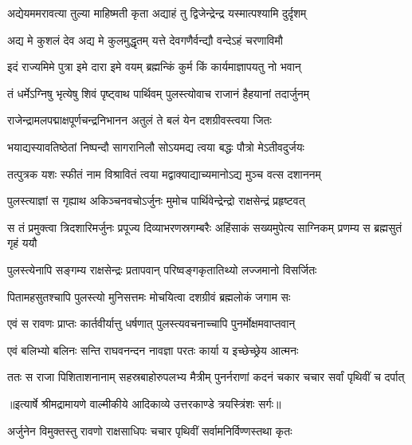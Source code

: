 \twolineshloka
{अद्येयममरावत्या तुल्या माहिष्मती कृता}
{अद्याहं तु द्विजेन्द्रेन्द्र यस्मात्पश्यामि दुर्दृशम्} %

\twolineshloka
{अद्य मे कुशलं देव अद्य मे कुलमुद्धृतम्}
{यत्ते देवगणैर्वन्द्यौ वन्देऽहं चरणाविमौ} %

\twolineshloka
{इदं राज्यमिमे पुत्रा इमे दारा इमे वयम्}
{ब्रह्मन्किं कुर्म किं कार्यमाज्ञापयतु नो भवान्} %

\twolineshloka
{तं धर्मेऽग्निषु भृत्येषु शिवं पृष्ट्वाथ पार्थिवम्}
{पुलस्त्योवाच राजानं हैहयानां तदार्जुनम्} %

\twolineshloka
{राजेन्द्रामलपद्माक्षपूर्णचन्द्रनिभानन}
{अतुलं ते बलं येन दशग्रीवस्त्वया जितः} %

\twolineshloka
{भयाद्यस्यावतिष्ठेतां निष्पन्दौ सागरानिलौ}
{सोऽयमद्य त्वया बद्धः पौत्रो मेऽतीवदुर्जयः} %

\twolineshloka
{तत्पुत्रक यशः स्फीतं नाम विश्रावितं त्वया}
{मद्वाक्याद्याच्यमानोऽद्य मुञ्च वत्स दशाननम्} %

\twolineshloka
{पुलस्त्याज्ञां स गृह्याथ अकिञ्चनवचोऽर्जुनः}
{मुमोच पार्थिवेन्द्रेन्द्रो राक्षसेन्द्रं प्रहृष्टवत्} %

\fourlineindentedshloka
{स तं प्रमुक्त्वा त्रिदशारिमर्जुनः}
{प्रपूज्य दिव्याभरणस्रगम्बरैः}
{अहिंसाकं सख्यमुपेत्य साग्निकम्}
{प्रणम्य स ब्रह्मसुतं गृहं ययौ} %

\twolineshloka
{पुलस्त्येनापि सङ्गम्य राक्षसेन्द्रः प्रतापवान्}
{परिष्वङ्गकृतातिथ्यो लज्जमानो विसर्जितः} %

\twolineshloka
{पितामहसुतश्चापि पुलस्त्यो मुनिसत्तमः}
{मोचयित्वा दशग्रीवं ब्रह्मलोकं जगाम सः} %

\twolineshloka
{एवं स रावणः प्राप्तः कार्तवीर्यात्तु धर्षणात्}
{पुलस्त्यवचनाच्चापि पुनर्मोक्षमवाप्तवान्} %

\twolineshloka
{एवं बलिभ्यो बलिनः सन्ति राघवनन्दन}
{नावज्ञा परतः कार्या य इच्छेच्छ्रेय आत्मनः} %

\fourlineindentedshloka
{ततः स राजा पिशिताशनानाम्}
{सहस्रबाहोरुपलभ्य मैत्रीम्}
{पुनर्नराणां कदनं चकार}
{चचार सर्वां पृथिवीं च दर्पात्} %


{॥इत्यार्षे श्रीमद्रामायणे वाल्मीकीये आदिकाव्ये उत्तरकाण्डे त्रयस्त्रिंशः सर्गः॥}


\twolineshloka
{अर्जुनेन विमुक्तस्तु रावणो राक्षसाधिपः}
{चचार पृथिवीं सर्वामनिर्विण्णस्तथा कृतः} %

